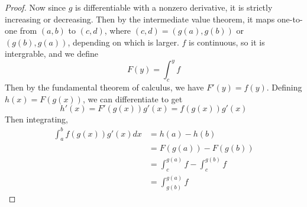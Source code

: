\documentclass[12pt]{article}
\begin{document}
\begin{proof}
    Now since $g$ is differentiable with a nonzero derivative, it is strictly increasing or decreasing. Then by the intermediate value theorem, it maps one-to-one from $(a,b)$ to $(c,d)$, where $(c,d) = (g(a),g(b))$ or $(g(b),g(a))$, depending on which is larger. $f$ is continuous, so it is intergrable, and we define
    $$F(y) = \int_c^y f$$
    Then by the fundamental theorem of calculus, we have $F'(y) = f(y)$. Defining $h(x) = F(g(x))$, we can differentiate to get
    $$h'(x) = F'(g(x))g'(x) = f(g(x))g'(x)$$
    Then integrating,
    \begin{align*}
        \int_a^b f(g(x))g'(x)dx &= h(a) - h(b) \\
                                &= F(g(a)) - F(g(b)) \\
                                &= \int_c^{g(a)} f - \int_c^{g(b)} f \\
                                &= \int_{g(b)}^{g(a)} f
    \end{align*}
\end{proof}
\end{document}
